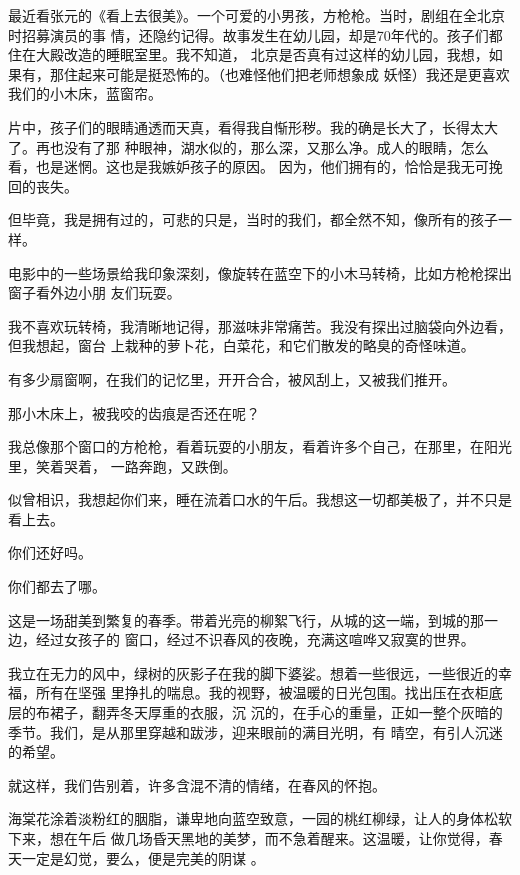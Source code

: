\documentclass[12pt,a4paper]{article}
\begin{document}
		最近看张元的《看上去很美》。一个可爱的小男孩，方枪枪。当时，剧组在全北京时招募演员的事
	情，还隐约记得。故事发生在幼儿园，却是70年代的。孩子们都住在大殿改造的睡眠室里。我不知道，
	北京是否真有过这样的幼儿园，我想，如果有，那住起来可能是挺恐怖的。（也难怪他们把老师想象成
	妖怪）我还是更喜欢我们的小木床，蓝窗帘。

		片中，孩子们的眼睛通透而天真，看得我自惭形秽。我的确是长大了，长得太大了。再也没有了那
	种眼神，湖水似的，那么深，又那么净。成人的眼睛，怎么看，也是迷惘。这也是我嫉妒孩子的原因。
	因为，他们拥有的，恰恰是我无可挽回的丧失。

		但毕竟，我是拥有过的，可悲的只是，当时的我们，都全然不知，像所有的孩子一样。

		电影中的一些场景给我印象深刻，像旋转在蓝空下的小木马转椅，比如方枪枪探出窗子看外边小朋
	友们玩耍。

		我不喜欢玩转椅，我清晰地记得，那滋味非常痛苦。我没有探出过脑袋向外边看，但我想起，窗台
	上栽种的萝卜花，白菜花，和它们散发的略臭的奇怪味道。

		有多少扇窗啊，在我们的记忆里，开开合合，被风刮上，又被我们推开。

		那小木床上，被我咬的齿痕是否还在呢？

		我总像那个窗口的方枪枪，看着玩耍的小朋友，看着许多个自己，在那里，在阳光里，笑着哭着，
	一路奔跑，又跌倒。

		似曾相识，我想起你们来，睡在流着口水的午后。我想这一切都美极了，并不只是看上去。

		你们还好吗。

		你们都去了哪。

	\endwriting



		这是一场甜美到繁复的春季。带着光亮的柳絮飞行，从城的这一端，到城的那一边，经过女孩子的
	窗口，经过不识春风的夜晚，充满这喧哗又寂寞的世界。

		我立在无力的风中，绿树的灰影子在我的脚下婆娑。想着一些很远，一些很近的幸福，所有在坚强
	里挣扎的喘息。我的视野，被温暖的日光包围。找出压在衣柜底层的布裙子，翻弄冬天厚重的衣服，沉
	沉的，在手心的重量，正如一整个灰暗的季节。我们，是从那里穿越和跋涉，迎来眼前的满目光明，有
	晴空，有引人沉迷的希望。

		就这样，我们告别着，许多含混不清的情绪，在春风的怀抱。

		海棠花涂着淡粉红的胭脂，谦卑地向蓝空致意，一园的桃红柳绿，让人的身体松软下来，想在午后
	做几场昏天黑地的美梦，而不急着醒来。这温暖，让你觉得，春天一定是幻觉，要么，便是完美的阴谋
	。
\end{document}

